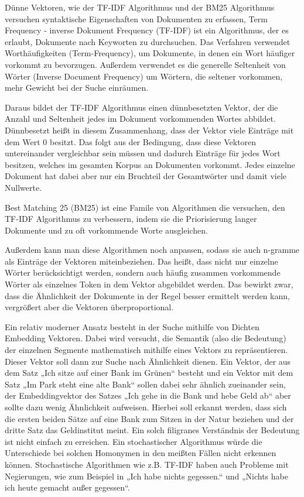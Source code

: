 Dünne Vektoren, wie der TF-IDF Algorithmus und der BM25 Algorithmus versuchen syntaktische Eigenschaften von Dokumenten zu erfassen,
Term Frequency - inverse Dokument Frequency (TF-IDF) ist ein Algorithmus, der es erlaubt, Dokumente nach Keyworten zu durchsuchen.
Das Verfahren verwendet Worthäufigkeiten (Term-Frequency), um Dokumente, in denen ein Wort häufiger vorkommt zu bevorzugen.
Außerdem verwendet es die generelle Seltenheit von Wörter (Inverse Document Frequency) um Wörtern, die seltener vorkommen, mehr Gewicht bei der Suche einräumen.

Daraus bildet der TF-IDF Algorithmus einen dünnbesetzten Vektor, der die Anzahl und Seltenheit jedes im Dokument vorkommenden Wortes abbildet. 
Dünnbesetzt heißt in diesem Zusammenhang, dass der Vektor viele Einträge mit dem Wert 0 besitzt. 
Das folgt aus der Bedingung, dass diese Vektoren untereinander vergleichbar sein müssen und dadurch Einträge für jedes Wort besitzen, welches im gesamten Korpus an Dokumenten vorkommt.
Jedes einzelne Dokument hat dabei aber nur ein Bruchteil der Gesamtwörter und damit viele Nullwerte.

Best Matching 25 (BM25) ist eine Famile von Algorithmen die versuchen, den TF-IDF Algorithmus zu verbessern, indem sie die Priorisierung langer Dokumente und zu oft vorkommende Worte ausgleichen.

Außerdem kann man diese Algorithmen noch anpassen, sodass sie auch n-gramme als Einträge der Vektoren miteinbeziehen. 
Das heißt, dass nicht nur einzelne Wörter berücksichtigt werden, sondern auch häufig zusammen vorkommende Wörter als einzelnes Token in dem Vektor abgebildet werden. 
Das bewirkt zwar, dass die Ähnlichkeit der Dokumente in der Regel besser ermittelt werden kann, vergrößert aber die Vektoren überproportional.

Ein relativ moderner Ansatz besteht in der Suche mithilfe von Dichten Embedding Vektoren. 
Dabei wird versucht, die Semantik (also die Bedeutung) der einzelnen Segmente mathematisch mithilfe eines Vektors zu repräsentieren. 
Dieser Vektor soll dann zur Suche nach Ähnlichkeit dienen. 
Ein Vektor, der aus dem Satz „Ich sitze auf einer Bank im Grünen“ besteht und ein Vektor mit dem Satz „Im Park steht eine alte Bank“ sollen dabei sehr ähnlich zueinander sein, der Embeddingvektor des Satzes „Ich gehe in die Bank und hebe Geld ab“ aber sollte dazu wenig Ähnlichkeit aufweisen. 
Hierbei soll erkannt werden, dass sich die ersten beiden Sätze auf eine Bank zum Sitzen in der Natur beziehen und der dritte Satz das Geldinstitut meint. 
Ein solch filigranes Verständnis der Bedeutung ist nicht einfach zu erreichen. 
Ein stochastischer Algorithmus würde die Unterschiede bei solchen Homonymen in den meißten Fällen nicht erkennen können. 
Stochastische Algorithmen wie z.B. TF-IDF haben auch Probleme mit Negierungen, wie zum Beispiel in „Ich habe nichts gegessen.“ und „Nichts habe ich heute gemacht außer gegessen“.

